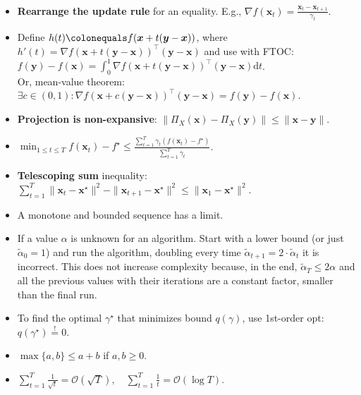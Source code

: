 \documentclass[8pt,a4paper]{extarticle}
\renewcommand{\vec}[1]{\bm{#1}}
\newenvironment{topic}[1]
{\textbf{\sffamily \colorbox{black}{\rlap{\textbf{\textcolor{white}{#1}}}\hspace{\linewidth}\hspace{-2\fboxsep}}} \\ \vspace{0.2cm}}
{}
\begin{document}
\begin{multicols*}{2}
    \begin{topic}{Common tricks}
        \begin{itemize}
            \item \textbf{Rearrange the update rule} for an equality. E.g., $\nabla f(\vec{x}_t) = \frac{\vec{x}_t -
                          \vec{x}_{t+1}}{\gamma_t}$.
            \item Define $h(t) \colonequals f(\vec{x} + t(\vec{y} - \vec{x}))$, where $h'(t) = \nabla f(\vec{x} +
                      t(\vec{y} - \vec{x}))^\top (\vec{y} - \vec{x})$ and use with FTOC: $f(\vec{y}) - f(\vec{x}) =
                      \int_0^1 \nabla f(\vec{x} + t(\vec{y} - \vec{x}))^\top (\vec{y} - \vec{x}) \mathrm{d}t$. \\ Or,
                  mean-value theorem: $\exists c \in (0,1) : \nabla f(\vec{x} + c(\vec{y} - \vec{x}))^\top (\vec{y} -
                      \vec{x}) = f(\vec{y}) - f(\vec{x})$.
            \item \textbf{Projection is non-expansive}: $\| \Pi_X(\vec{x}) - \Pi_X(\vec{y}) \| \leq \| \vec{x} -
                      \vec{y} \|$.
            \item $\min_{1 \leq t \leq T} f(\vec{x}_t) - f^\star \leq \frac{\sum_{t=1}^{T} \gamma_t (f(\vec{x}_t) - f^\star)}{\sum_{t=1}^{T} \gamma_t}$.
            \item \textbf{Telescoping sum} inequality: $\sum_{t=1}^{T} \| \vec{x}_t - \vec{x}^\star \|^2 - \| \vec{x}_{t+1} -
                      \vec{x}^\star \|^2 \leq \| \vec{x}_1 - \vec{x}^\star \|^2$.
            \item A monotone and bounded sequence has a limit.
            \item If a value $\alpha$ is unknown for an algorithm. Start with a lower bound (or just
                  $\tilde{\alpha}_0=1$) and run the algorithm, doubling every time $\tilde{\alpha}_{t+1} = 2 \cdot
                      \tilde{\alpha}_t$ it is incorrect. This does not increase complexity because, in the end,
                  $\tilde{\alpha}_T \leq 2 \alpha$ and all the previous values with their iterations are a constant
                  factor, smaller than the final run.
            \item To find the optimal $\gamma^\star$ that minimizes bound $q(\gamma)$, use 1st-order opt:
                  $q(\gamma^\star) \overset{!}{=} 0$.
            \item $\max \{ a,b \} \leq a + b$ if $a,b \geq 0$.
            \item $\sum_{t=1}^{T} \frac{1}{\sqrt{t}} = \mathcal{O}(\sqrt{T}), \quad \sum_{t=1}^{T} \frac{1}{t} = \mathcal{O}(\log T)$.

\end{itemize}
\end{topic}
\end{multicols*}
\end{document}
